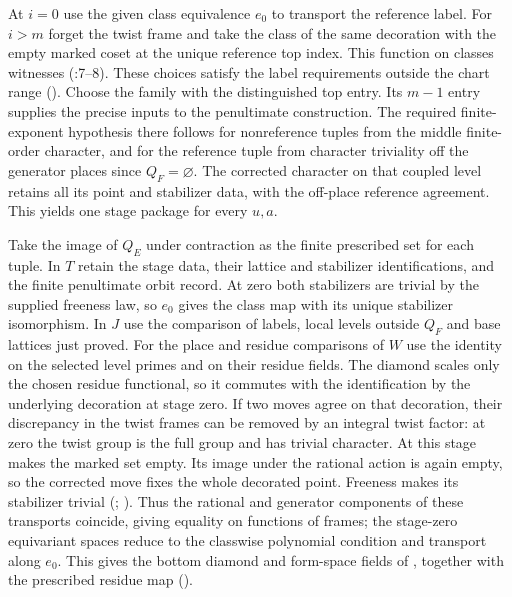 At $i=0$ use the given class equivalence $e_0$ to transport the reference
label. For $i>m$ forget the twist frame and take the class of the same
decoration with the empty marked coset at the unique reference top index.
This function on classes witnesses
(:7--8).
These choices satisfy the label requirements outside the chart range
().
Choose the family with the distinguished top entry. Its $m-1$ entry
supplies the precise inputs to the penultimate construction. The required
finite-exponent hypothesis there follows for nonreference tuples from
the middle finite-order character, and for the reference tuple from
character triviality off the generator places since $Q_F=\varnothing$.
The corrected character on that coupled level retains all its point and
stabilizer data, with the off-place reference agreement. This yields
one stage package for every $u,a$.

Take the image of $Q_E$ under contraction as the finite prescribed set
for each tuple. In $T$ retain the stage data, their lattice and
stabilizer identifications, and the finite penultimate orbit record.
At zero both stabilizers are trivial by the supplied freeness law,
so $e_0$ gives the class map with its unique stabilizer isomorphism.
In $J$ use the comparison of labels, local levels outside $Q_F$ and
base lattices just proved. For the place and residue comparisons of $W$
use the identity on the selected level primes and on their residue
fields. The diamond scales only the chosen residue functional, so it
commutes with the identification by the underlying decoration at stage
zero. If two moves agree on that decoration, their discrepancy in the
twist frames can be removed by an integral twist factor: at zero the
twist group is the full group and has trivial character. At this stage
 makes the marked set empty. Its image under the
rational action is again empty, so the corrected move fixes the whole
decorated point. Freeness makes its stabilizer trivial
(;
). Thus the rational and generator
components of these transports coincide, giving equality on functions
of frames; the stage-zero equivariant spaces reduce to the classwise
polynomial condition and transport along $e_0$. This gives the bottom
diamond and form-space fields of , together with
the prescribed residue map ().

